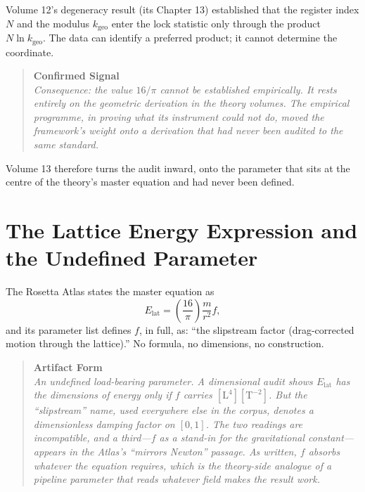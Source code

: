 \documentclass[11pt, letterpaper, openany]{book}
\begin{document}
Volume 12's degeneracy result (its Chapter 13) established that the register index $N$ and the modulus $k_{\text{geo}}$ enter the lock statistic only through the product $N \ln k_{\text{geo}}$. The data can identify a preferred product; it cannot determine the coordinate.

\begin{quote}
\textbf{Confirmed Signal} \\
\textit{Consequence: the value $16/\pi$ cannot be established empirically. It rests entirely on the geometric derivation in the theory volumes. The empirical programme, in proving what its instrument could not do, moved the framework's weight onto a derivation that had never been audited to the same standard.}
\end{quote}

Volume 13 therefore turns the audit inward, onto the parameter that sits at the centre of the theory's master equation and had never been defined.

\section{The Lattice Energy Expression and the Undefined Parameter}

The Rosetta Atlas states the master equation as
\begin{equation}
E_{\text{lat}} = \left(\frac{16}{\pi}\right) \frac{m}{r^2} f, \tag{3.1}
\end{equation}
and its parameter list defines $f$, in full, as: ``the slipstream factor (drag-corrected motion through the lattice).'' No formula, no dimensions, no construction.

\begin{quote}
\textbf{Artifact Form} \\
\textit{An undefined load-bearing parameter. A dimensional audit shows $E_{\text{lat}}$ has the dimensions of energy only if $f$ carries $[\mathrm{L}^4][\mathrm{T}^{-2}]$. But the ``slipstream'' name, used everywhere else in the corpus, denotes a dimensionless damping factor on $[0,1]$. The two readings are incompatible, and a third—$f$ as a stand-in for the gravitational constant—appears in the Atlas's ``mirrors Newton'' passage. As written, $f$ absorbs whatever the equation requires, which is the theory-side analogue of a pipeline parameter that reads whatever field makes the result work.}
\end{quote}


\end{document}
